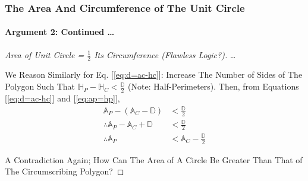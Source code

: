 \begin{frame}
\frametitle{The Area And Circumference of The Unit Circle}
\framesubtitle{Argument 2: Continued \dots}
\label{slide:arg-2-archimedes-4}
\begin{proof}[Area of Unit Circle = $\frac{1}{2}$ Its Circumference ({\tiny Flawless Logic?})]
\let\qed\relax %
\dots

We Reason Similarly for Eq. [\ref{eq:d=ac-hc}]: Increase The Number of Sides of The Polygon Such That $\mathbb{H}_P-\mathbb{H}_C<\frac{\mathbb{D}}{2}$ (Note: Half-Perimeters).  Then, from Equations [\ref{eq:d=ac-hc}] and [\ref{eq:ap=hp}],
\begin{equation}
\begin{aligned}
\mathbb{A}_P-(\mathbb{A}_C-\mathbb{D})&<\frac{\mathbb{D}}{2}\\
\therefore\mathbb{A}_P-\mathbb{A}_C+\mathbb{D}&<\frac{\mathbb{D}}{2}\\
\therefore\mathbb{A}_P&<\mathbb{A}_C-\frac{\mathbb{D}}{2}
\end{aligned}
\end{equation}

A Contradiction Again; How Can The Area of A Circle Be Greater Than That of The Circumscribing Polygon?

\end{proof}
\end{frame}
